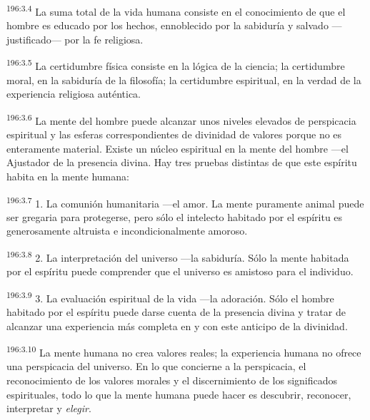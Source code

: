 \par 
\textsuperscript{196:3.4} La suma total de la vida humana consiste en el conocimiento de que el hombre es educado por los hechos, ennoblecido por la sabiduría y salvado ---justificado--- por la fe religiosa.

\par 
\textsuperscript{196:3.5} La certidumbre física consiste en la lógica de la ciencia; la certidumbre moral, en la sabiduría de la filosofía; la certidumbre espiritual, en la verdad de la experiencia religiosa auténtica.

\par 
\textsuperscript{196:3.6} La mente del hombre puede alcanzar unos niveles elevados de perspicacia espiritual y las esferas correspondientes de divinidad de valores porque no es enteramente material. Existe un núcleo espiritual en la mente del hombre ---el Ajustador de la presencia divina. Hay tres pruebas distintas de que este espíritu habita en la mente humana:

\par 
\textsuperscript{196:3.7} 1. La comunión humanitaria ---el amor. La mente puramente animal puede ser gregaria para protegerse, pero sólo el intelecto habitado por el espíritu es generosamente altruista e incondicionalmente amoroso.

\par 
\textsuperscript{196:3.8} 2. La interpretación del universo ---la sabiduría. Sólo la mente habitada por el espíritu puede comprender que el universo es amistoso para el individuo.

\par 
\textsuperscript{196:3.9} 3. La evaluación espiritual de la vida ---la adoración. Sólo el hombre habitado por el espíritu puede darse cuenta de la presencia divina y tratar de alcanzar una experiencia más completa en y con este anticipo de la divinidad.

\par 
\textsuperscript{196:3.10} La mente humana no crea valores reales; la experiencia humana no ofrece una perspicacia del universo. En lo que concierne a la perspicacia, el reconocimiento de los valores morales y el discernimiento de los significados espirituales, todo lo que la mente humana puede hacer es descubrir, reconocer, interpretar y \textit{elegir}.

